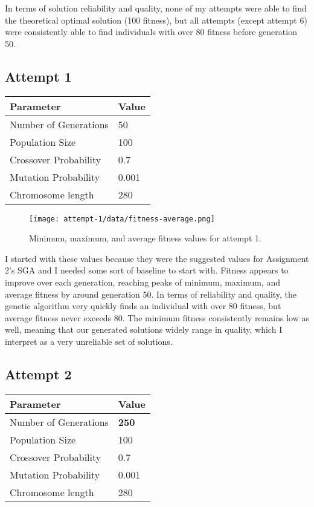 \documentclass[12pt, letterpaper]{article}
\begin{document}
In terms of solution reliability and quality,
none of my attempts were able to find the theoretical optimal solution (100 fitness),
but all attempts (except attempt 6) were consistently able to find individuals with over 80 fitness before generation 50.

\subsection{Attempt 1}
\begin{center}
\begin{tabular}{p{} l}
    \toprule
    \textbf{Parameter}      & \textbf{Value}    \\ \midrule
    Number of Generations   & 50                \\
    Population Size         & 100               \\
    Crossover Probability   & 0.7               \\
    Mutation Probability    & 0.001             \\
    Chromosome length       & 280               \\ \bottomrule
\end{tabular}
\end{center}

\begin{figure}[H]
    \centerline{\texttt{[image: attempt-1/data/fitness-average.png]}}
    \caption{Minimum, maximum, and average fitness values for attempt 1.}\label{Fig:Attempt1Fitness}
\end{figure}

I started with these values because they were the suggested values for Assignment 2's SGA
and I needed some sort of baseline to start with.
Fitness appears to improve over each generation, reaching peaks of minimum, maximum, and average fitness by around generation 50.
In terms of reliability and quality, the genetic algorithm very quickly finds an individual with over 80 fitness,
but average fitness never exceeds 80.
The minimum fitness consistently remains low as well, meaning that our generated solutions widely range in quality,
which I interpret as a very unreliable set of solutions.

\subsection{Attempt 2}
\begin{center}
\begin{tabular}{p{} l}
    \toprule
    \textbf{Parameter}      & \textbf{Value}    \\ \midrule
    Number of Generations   & \textbf{250}      \\
    Population Size         & 100               \\
    Crossover Probability   & 0.7               \\
    Mutation Probability    & 0.001             \\
    Chromosome length       & 280               \\ \bottomrule
\end{tabular}
\end{center}
\end{document}
